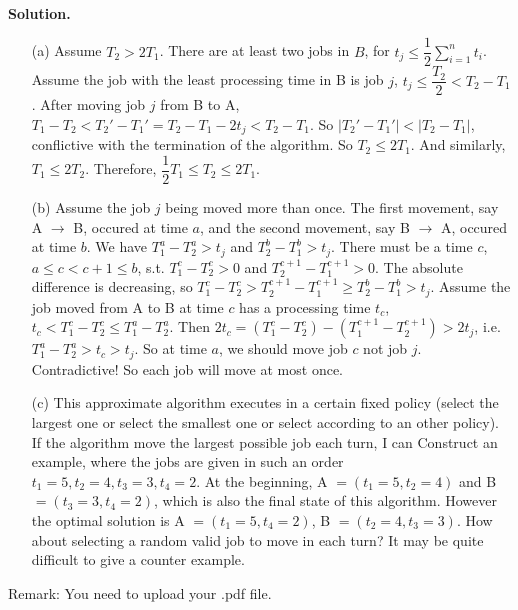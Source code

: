 \documentclass{article}
\begin{document}
\begin{enumerate}
~\\
\textbf{Solution.}\\
\begin{spacing}{1.5}
\begin{itemize}
    \item [(a)] 
        Assume $T_2>2T_1$. There are at least two jobs in $B$, for $t_j\leq \dfrac{1}{2}\sum_{i=1}^n t_i$. Assume the job with the least processing time in B is job $j$, $t_j\leq \dfrac{T_2}{2} < T_2-T_1$. After moving job $j$ from B to A, $T_1-T_2<T_2'-T_1'=T_2-T_1-2t_j<T_2-T_1$. So $|T_2'-T_1'|<|T_2-T_1|$, conflictive with the termination of the algorithm. So $T_2\leq 2T_1$. And similarly, $T_1\leq 2T_2$. Therefore, $\dfrac{1}{2}T_1\leq T_2\leq 2T_1$.
    \item [(b)] 
        Assume the job $j$ being moved more than once. The first movement, say A $\rightarrow$ B, occured at time $a$, and the second movement, say B $\rightarrow$ A, occured at time $b$. We have $T_1^a-T_2^a>t_j$ and $T_2^b-T_1^b>t_j$. There must be a time $c$, $a\leq c < c+1 \leq b$, s.t. $T_1^c-T_2^c>0$ and $T_2^{c+1} - T_1^{c+1} > 0$. The absolute difference is decreasing, so $T_1^c-T_2^c>T_2^{c+1}-T_1^{c+1}\geq T_2^b-T_1^b>t_j$. Assume the job moved from A to B at time $c$ has a processing time $t_c$, $t_c<T_1^c-T_2^c\leq T_1^a-T_2^a$. Then $2t_c = (T_1^c-T_2^c) - (T_1^{c+1} - T_2^{c+1})>2t_j$, i.e. $T_1^a-T_2^a>t_c>t_j$. So at time $a$, we should move job $c$ not job $j$. Contradictive! So each job will move at most once.
    \item [(c)] This approximate algorithm executes in a certain fixed policy (select the largest one or select the smallest one or select according to an other policy). If the algorithm move the largest possible job each turn, I can Construct an example, where the jobs are given in such an order $t_1=5,t_2=4,t_3=3,t_4=2$. At the beginning, A $=(t_1=5,t_2=4)$ and B $=(t_3=3,t_4=2)$, which is also the final state of this algorithm. However the optimal solution is A $=(t_1=5,t_4=2)$, B $=(t_2=4,t_3=3)$. How about selecting a random valid job to move in each turn? It may be quite difficult to give a counter example. 
\end{itemize}
\end{spacing}

\end{enumerate}

Remark: You need to upload your .pdf file.
\end{document}
